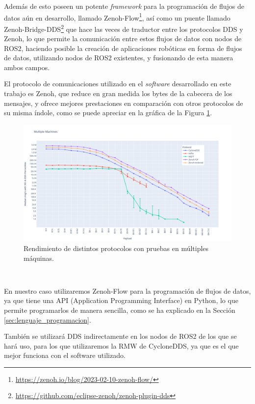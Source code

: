 Además de esto poseen un potente \textit{framework} para la programación de
flujos de datos aún en desarrollo, llamado
Zenoh-Flow\footnote{\url{https://zenoh.io/blog/2023-02-10-zenoh-flow/}}, así
como un puente llamado
Zenoh-Bridge-DDS\footnote{\url{https://github.com/eclipse-zenoh/zenoh-plugin-dds}}
que hace las veces de traductor entre los protocolos DDS y Zenoh, lo que permite
la comunicación entre estos flujos de datos con nodos de ROS2, haciendo posible
la creación de aplicaciones robóticas en forma de flujos de datos, utilizando
nodos de ROS2 existentes, y fusionando de esta manera ambos campos.

El protocolo de comunicaciones utilizado en el \textit{software} desarrollado en
este trabajo es Zenoh, que reduce en gran medida los bytes de la cabecera de los
mensajes, y ofrece mejores prestaciones en comparación con otros protocolos de
su misma índole, como se puede apreciar en la gráfica de la Figura
\ref{fig:zenoh_performance}.

\begin{figure} [h!]
  \begin{center}
    \includegraphics[width=15cm]{figs/zenoh_performance}
  \end{center}
  \caption{Rendimiento de distintos protocolos con pruebas en múltiples máquinas.}
  \label{fig:zenoh_performance}
\end{figure}\

En nuestro caso utilizaremos Zenoh-Flow para la programación de flujos de datos,
ya que tiene una API (Application Programming Interface) en Python, lo que
permite programarlos de manera sencilla, como se ha explicado en la Sección
\ref{sec:lenguaje_programacion}.

También se utilizará DDS indirectamente en los nodos de ROS2 de los que se hará
uso, para los que utilizaremos la RMW de CycloneDDS, ya que es el que mejor
funciona con el software utilizado.

